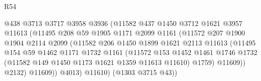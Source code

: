 \begin{lexlean}{R54}
\begin{coremodule}
                                    @438
                                    @3713
                                    @3717
                                    @3958
                                    @3936
                                    (@11582
                                      @437
                                      @1450
                                      @3712
                                      @1621
                                      @3957
                                      @11613
                                      (@11495
                                        @208
                                        @59
                                        @1905
                                        @1171
                                        @2099
                                        @1161
                                        (@11572
                                          @207
                                          @1900
                                          @1904
                                          @2114
                                          @2099
                                          (@11582
                                            @206
                                            @1450
                                            @1899
                                            @1621
                                            @2113
                                            @11613
                                            (@11495
                                              @154
                                              @59
                                              @1462
                                              @1171
                                              @1732
                                              @1161
                                              (@11572
                                                @153
                                                @1452
                                                @1461
                                                @1746
                                                @1732
                                                (@11582 @149 @1450 @1173 @1621 @1359 @11613 @11610)
                                                @1759)
                                              @11609))
                                          @2132)
                                        @11609))
                                    @4013)
                                  @11610)
                                (@1303 @3715 @43))

\end{coremodule}
\end{lexlean}
